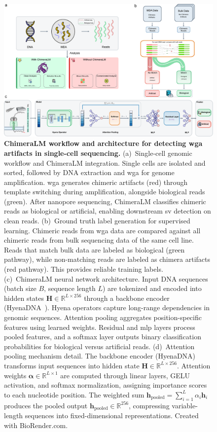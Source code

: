 \documentclass[pdflatex,sn-nature,lineno]{sn-jnl}%
\theoremstyle{thmstyleone}%
\theoremstyle{thmstyletwo}%
\theoremstyle{thmstylethree}%
\begin{document}
\begin{figure}[p]
	\begin{center}
		\includegraphics[width=\textwidth]{final_figures/figure1}
	\end{center}
	\caption{{\bf ChimeraLM workflow and architecture for detecting \gls{wga} artifacts in single-cell sequencing.}
		(a)~Single-cell genomic workflow and ChimeraLM integration. Single cells are isolated and sorted, followed by DNA extraction and \gls{wga} for genome amplification. \gls{wga} generates chimeric artifacts (red) through template switching during amplification, alongside biological reads (green). After nanopore sequencing, ChimeraLM classifies chimeric reads as biological or artificial, enabling downstream \gls{sv} detection on clean reads.
		(b)~Ground truth label generation for supervised learning. Chimeric reads from \gls{wga} data are compared against all chimeric reads from bulk sequencing data of the same cell line. Reads that match bulk data are labeled as biological (green pathway), while non-matching reads are labeled as chimera artifacts (red pathway). This provides reliable training labels.
		(c)~ChimeraLM neural network architecture. Input DNA sequences (batch size $B$, sequence length $L$) are tokenized and encoded into hidden states $\mathbf{H} \in \mathbb{R}^{L \times 256}$ through a backbone encoder (HyenaDNA~\cite{nguyen2023hyenadna}). Hyena operators capture long-range dependencies in genomic sequences. Attention pooling aggregates position-specific features using learned weights. Residual and \gls{mlp} layers process pooled features, and a softmax layer outputs binary classification probabilities for biological versus artificial reads.
		(d)~Attention pooling mechanism detail. The backbone encoder (HyenaDNA) transforms input sequences into hidden state $\mathbf{H} \in \mathbb{R}^{L \times 256}$. Attention weights $\boldsymbol{\alpha} \in \mathbb{R}^{L \times 1}$ are computed through linear layers, GELU activation, and softmax normalization, assigning importance scores to each nucleotide position. The weighted sum $\mathbf{h}_{\text{pooled}} = \sum_{i=1}^{L} \alpha_i \mathbf{h}_i$ produces the pooled output $\mathbf{h}_{\text{pooled}} \in \mathbb{R}^{256}$, compressing variable-length sequences into fixed-dimensional representations.
		Created with BioRender.com.} 
	\label{fig:figure1}
\end{figure}
\end{document}
